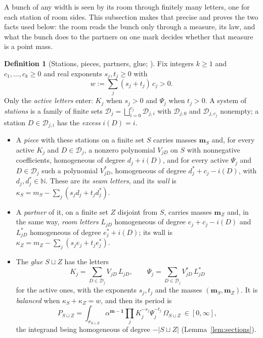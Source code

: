 \documentclass[11pt]{article}
\theoremstyle{plain}
\theoremstyle{definition}
\newtheorem{defn}[prop]{Definition}
\theoremstyle{remark}
\newcommand{\cD}{\mathcal D}
\newcommand{\N}{\mathbb N}
\newcommand{\bm}{\mathbf m}
\begin{document}
A bunch of any width is seen by its room through finitely many letters, one for each station of room sides. This subsection makes that precise and proves the two facts used below: the room reads the bunch only through a measure, its law, and what the bunch does to the partners on one mark decides whether that measure is a point mass.

\begin{defn}[Stations, pieces, partners, glue; {\cite[Def.~27.4, p.~227]{F}}]\label{def:piece}
Fix integers $k\ge1$ and $c_1,\dots,c_k\ge0$ and real exponents $s_j,t_j\ge0$ with
\[
w:=\sum_j(s_j+t_j)\,c_j>0 .
\]
Only the \emph{active letters} enter: $K_j$ when $s_j>0$ and $\Psi_j$ when $t_j>0$. A system of \emph{stations} is a family of finite sets $\cD_j=\bigsqcup_{i=0}^{c_j}\cD_{j,i}$ with $\cD_{j,0}$ and $\cD_{j,c_j}$ nonempty; a station $D\in\cD_{j,i}$ has the \emph{excess} $i(D)=i$.
\begin{itemize}
\item A \emph{piece} with these stations on a finite set $S$ carries masses $\bm_S$ and, for every active $K_j$ and $D\in\cD_j$, a nonzero polynomial $V_{jD}$ on $S$ with nonnegative coefficients, homogeneous of degree $d_j+i(D)$, and for every active $\Psi_j$ and $D\in\cD_j$ such a polynomial $V^\ast_{jD}$, homogeneous of degree $d^\ast_j+c_j-i(D)$, with $d_j,d^\ast_j\in\N$. These are its \emph{seam letters}, and its \emph{wall} is $\kappa_S=m_S-\sum_j(s_jd_j+t_jd^\ast_j)$.
\item A \emph{partner} of it, on a finite set $Z$ disjoint from $S$, carries masses $\bm_Z$ and, in the same way, \emph{room letters} $L_{jD}$ homogeneous of degree $e_j+c_j-i(D)$ and $L^\ast_{jD}$ homogeneous of degree $e^\ast_j+i(D)$; its wall is $\kappa_Z=m_Z-\sum_j(s_je_j+t_je^\ast_j)$.
\item The \emph{glue} $S\sqcup Z$ has the letters
\[
K_j=\sum_{D\in\cD_j}V_{jD}\,L_{jD},\qquad \Psi_j=\sum_{D\in\cD_j}V^\ast_{jD}\,L^\ast_{jD}
\]
for the active ones, with the exponents $s_j,t_j$ and the masses $(\bm_S,\bm_Z)$. It is \emph{balanced} when $\kappa_S+\kappa_Z=w$, and then its period is
\[
P_{S\sqcup Z}=\int_{\sigma_{S\sqcup Z}}\alpha^{\bm-\mathbf 1}\prod_jK_j^{-s_j}\Psi_j^{-t_j}\,\Omega_{S\sqcup Z}\ \in[0,\infty],
\]
the integrand being homogeneous of degree $-|S\sqcup Z|$ (Lemma~\ref{lem:sections}).
\end{itemize}
\end{defn}
\end{document}
